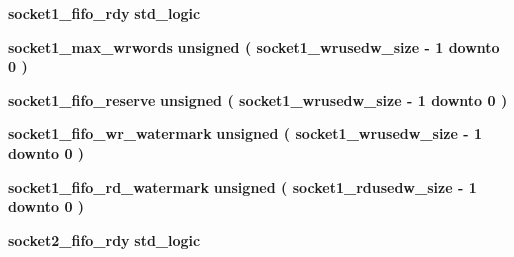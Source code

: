 \begin{DoxyCompactItemize}
\item 
{\bf socket1\+\_\+fifo\+\_\+rdy} {\bfseries \textcolor{comment}{std\+\_\+logic}\textcolor{vhdlchar}{ }} 
\item 
{\bf socket1\+\_\+max\+\_\+wrwords} {\bfseries \textcolor{comment}{unsigned}\textcolor{vhdlchar}{ }\textcolor{vhdlchar}{(}\textcolor{vhdlchar}{ }\textcolor{vhdlchar}{ }\textcolor{vhdlchar}{ }\textcolor{vhdlchar}{ }{\bfseries {\bf socket1\+\_\+wrusedw\+\_\+size}} \textcolor{vhdlchar}{-\/}\textcolor{vhdlchar}{ } \textcolor{vhdldigit}{1} \textcolor{vhdlchar}{ }\textcolor{keywordflow}{downto}\textcolor{vhdlchar}{ }\textcolor{vhdlchar}{ } \textcolor{vhdldigit}{0} \textcolor{vhdlchar}{ }\textcolor{vhdlchar}{)}\textcolor{vhdlchar}{ }} 
\item 
{\bf socket1\+\_\+fifo\+\_\+reserve} {\bfseries \textcolor{comment}{unsigned}\textcolor{vhdlchar}{ }\textcolor{vhdlchar}{(}\textcolor{vhdlchar}{ }\textcolor{vhdlchar}{ }\textcolor{vhdlchar}{ }\textcolor{vhdlchar}{ }{\bfseries {\bf socket1\+\_\+wrusedw\+\_\+size}} \textcolor{vhdlchar}{-\/}\textcolor{vhdlchar}{ } \textcolor{vhdldigit}{1} \textcolor{vhdlchar}{ }\textcolor{keywordflow}{downto}\textcolor{vhdlchar}{ }\textcolor{vhdlchar}{ } \textcolor{vhdldigit}{0} \textcolor{vhdlchar}{ }\textcolor{vhdlchar}{)}\textcolor{vhdlchar}{ }} 
\item 
{\bf socket1\+\_\+fifo\+\_\+wr\+\_\+watermark} {\bfseries \textcolor{comment}{unsigned}\textcolor{vhdlchar}{ }\textcolor{vhdlchar}{(}\textcolor{vhdlchar}{ }\textcolor{vhdlchar}{ }\textcolor{vhdlchar}{ }\textcolor{vhdlchar}{ }{\bfseries {\bf socket1\+\_\+wrusedw\+\_\+size}} \textcolor{vhdlchar}{-\/}\textcolor{vhdlchar}{ } \textcolor{vhdldigit}{1} \textcolor{vhdlchar}{ }\textcolor{keywordflow}{downto}\textcolor{vhdlchar}{ }\textcolor{vhdlchar}{ } \textcolor{vhdldigit}{0} \textcolor{vhdlchar}{ }\textcolor{vhdlchar}{)}\textcolor{vhdlchar}{ }} 
\item 
{\bf socket1\+\_\+fifo\+\_\+rd\+\_\+watermark} {\bfseries \textcolor{comment}{unsigned}\textcolor{vhdlchar}{ }\textcolor{vhdlchar}{(}\textcolor{vhdlchar}{ }\textcolor{vhdlchar}{ }\textcolor{vhdlchar}{ }\textcolor{vhdlchar}{ }{\bfseries {\bf socket1\+\_\+rdusedw\+\_\+size}} \textcolor{vhdlchar}{-\/}\textcolor{vhdlchar}{ } \textcolor{vhdldigit}{1} \textcolor{vhdlchar}{ }\textcolor{keywordflow}{downto}\textcolor{vhdlchar}{ }\textcolor{vhdlchar}{ } \textcolor{vhdldigit}{0} \textcolor{vhdlchar}{ }\textcolor{vhdlchar}{)}\textcolor{vhdlchar}{ }} 
\item 
{\bf socket2\+\_\+fifo\+\_\+rdy} {\bfseries \textcolor{comment}{std\+\_\+logic}\textcolor{vhdlchar}{ }} 

\end{DoxyCompactItemize}
